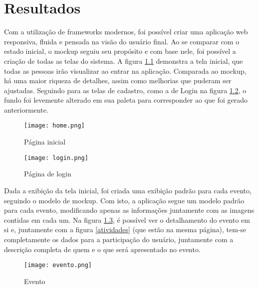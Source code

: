 \chapter{Resultados}\label{chp:LABEL_CHP_5}
\label{resultados}
Com a utilização de frameworks modernos, foi possível criar uma aplicação web responsiva, fluida e pensada na visão do usuário final. Ao se comparar com o estado inicial, o mockup seguiu seu propósito e com base nele, foi possível a criação de todas as telas do sistema. A figura \ref{home} demonstra a tela inicial, que todas as pessoas irão visualizar ao entrar na aplicação. Comparada ao mockup, há uma maior riqueza de detalhes, assim como melhorias que puderam ser ajustadas. Seguindo para as telas de cadastro, como a de Login na figura \ref{login}, o fundo foi levemente alterado em sua paleta para corresponder ao que foi gerado anteriormente. \\
\begin{figure}[h]
    \caption{\label{home}Página inicial}
    \vspace{5pt}
    \centering
    \texttt{[image: home.png]}
    \vspace{5pt}
\end{figure}
\begin{figure}[h]
    \caption{\label{login}Página de login}
    \vspace{5pt}
    \centering
    \texttt{[image: login.png]}
    \vspace{5pt}
\end{figure}
Dada a exibição da tela inicial, foi criada uma exibição padrão para cada evento, seguindo o modelo de mockup. Com isto, a aplicação segue um modelo padrão para cada evento, modificando apenas as informações juntamente com as imagens contidas em cada um. Na figura \ref{evento}, é possível ver o detalhamento do evento em si e, juntamente com a figura \ref{atividades} (que estão na mesma página), tem-se completamente os dados para a participação do usuário, juntamente com a descrição completa de quem e o que será apresentado no evento. \\
\begin{figure}[h]
    \caption{\label{evento}Evento}
    \vspace{5pt}
    \centering
    \texttt{[image: evento.png]}
    \vspace{5pt}
\end{figure}
